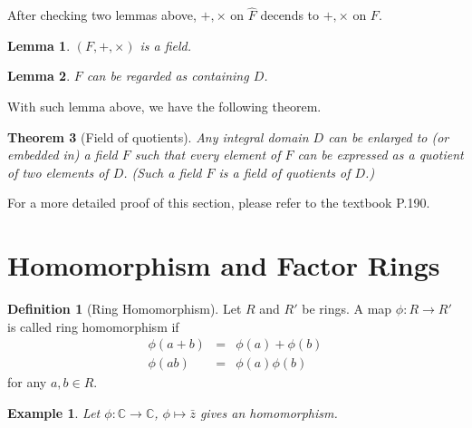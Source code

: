 \documentclass{article}
\theoremstyle{MyNonumberplain}
\theoremstyle{break}
\theoremstyle{break}
\newtheorem{theorem}{Theorem}[section]
\newtheorem{example}{Example}[section]
\newtheorem{lemma}[theorem]{Lemma}
\theoremstyle{break}
\theoremstyle{definition}
\theoremstyle{break}
\newtheorem{definition}{Definition}[section]
\begin{document}
After checking two lemmas above, $+, \times$ on $\hat{F}$ decends to $+, \times$ on $F$.

\begin{thmbox}
    \begin{lemma}
        $(F, +, \times)$ is a field. 
    \end{lemma}

\end{thmbox}

\begin{thmbox}
    \begin{lemma}
        $F$ can be regarded as containing $D$.
    \end{lemma}
\end{thmbox}

With such lemma above, we have the following theorem.

\begin{thmbox}
    \begin{theorem}[Field of quotients]
        Any integral domain $D$ can be enlarged to (or embedded in) a field $F$ such that every
        element of $F$ can be expressed as a quotient of two elements of $D$. (Such a field $F$ is a
        field of quotients of $D$.)
    \end{theorem}
\end{thmbox}

For a more detailed proof of this section, please refer to the textbook P.190.

\setcounter{section}{25}

\newpage

\section{Homomorphism and Factor Rings}

\begin{defbox}
    \begin{definition}[Ring Homomorphism]
        Let $R$ and $R'$ be rings. A map $\phi : R \rightarrow R'$ is called ring
        homomorphism if
        \begin{eqnarray*}
          \phi (a + b) & = & \phi (a) + \phi (b)\\
          \phi (a b) & = & \phi (a) \phi (b)
        \end{eqnarray*}
        for any $a, b \in R$.
    \end{definition}
\end{defbox}


\begin{expbox}
    \begin{example}
        Let $\phi : \mathbb{C} \rightarrow \mathbb{C}$, $\phi \mapsto \bar{z}$ gives
        an homomorphism.
    \end{example}
\end{expbox}
\end{document}
